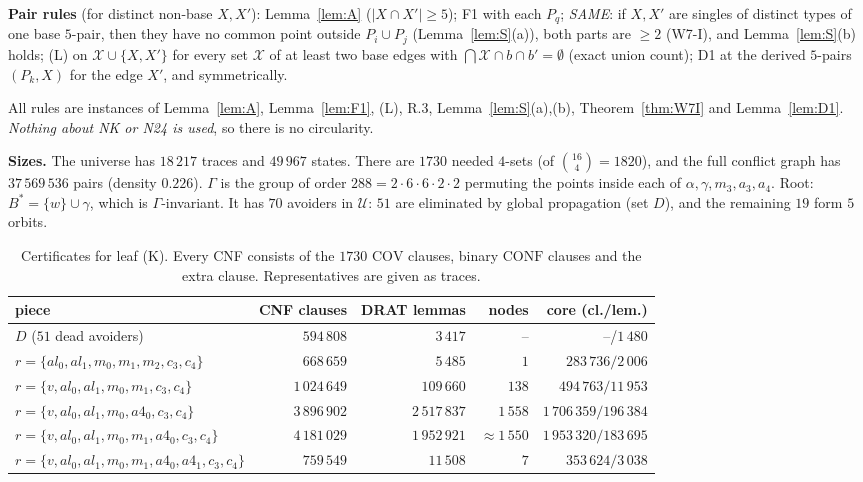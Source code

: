 \documentclass[11pt]{amsart}
\theoremstyle{definition}
\newcommand{\cU}{\mathcal{U}}
\newcommand{\Cov}{\mathrm{COV}}
\newcommand{\Conf}{\mathrm{CONF}}
\begin{document}
\textbf{Pair rules} (for distinct non-base $X,X'$): Lemma~\ref{lem:A} ($|X\cap X'|\ge5$); F1 with each $P_q$; \emph{SAME}: if $X,X'$ are singles of distinct types of one base $5$-pair, then they have no common point outside $P_i\cup P_j$ (Lemma~\ref{lem:S}(a)), both parts are $\ge2$ (W7-I), and Lemma~\ref{lem:S}(b) holds; (L) on $\mathcal X\cup\{X,X'\}$ for every set $\mathcal X$ of at least two base edges with $\bigcap\mathcal X\cap b\cap b'=\emptyset$ (exact union count); D1 at the derived $5$-pairs $(P_k,X)$ for the edge $X'$, and symmetrically.

All rules are instances of Lemma~\ref{lem:A}, Lemma~\ref{lem:F1}, (L), R.3, Lemma~\ref{lem:S}(a),(b), Theorem~\ref{thm:W7I} and Lemma~\ref{lem:D1}. \emph{Nothing about NK or N24 is used}, so there is no circularity.

\textbf{Sizes.} The universe has $18\,217$ traces and $49\,967$ states. There are $1730$ needed $4$-sets (of $\binom{16}4=1820$), and the full conflict graph has $37\,569\,536$ pairs (density $0.226$). $\Gamma$ is the group of order $288=2\cdot 6\cdot 6\cdot 2\cdot 2$ permuting the points inside each of $\alpha,\gamma,m_3,a_3,a_4$. Root: $B^*=\{w\}\cup\gamma$, which is $\Gamma$-invariant. It has $70$ avoiders in $\cU$: $51$ are eliminated by global propagation (set $D$), and the remaining $19$ form $5$ orbits.

\begin{table}[ht]\small
\caption{Certificates for leaf (K). Every CNF consists of the $1730$ $\Cov$ clauses, binary $\Conf$ clauses and the extra clause. Representatives are given as traces.}\label{tab:G14}
\setlength{\tabcolsep}{4pt}
\begin{tabular}{@{}lrrrr@{}}
\toprule
piece & CNF clauses & DRAT lemmas & nodes & core (cl./lem.)\\
\midrule
$D$ ($51$ dead avoiders) & $594\,808$ & $3\,417$ & -- & --/$1\,480$\\
$r=\{al_0,al_1,m_0,m_1,m_2,c_3,c_4\}$ & $668\,659$ & $5\,485$ & $1$ & $283\,736/2\,006$\\
$r=\{v,al_0,al_1,m_0,m_1,c_3,c_4\}$ & $1\,024\,649$ & $109\,660$ & $138$ & $494\,763/11\,953$\\
$r=\{v,al_0,al_1,m_0,a4_0,c_3,c_4\}$ & $3\,896\,902$ & $2\,517\,837$ & $1\,558$ & $1\,706\,359/196\,384$\\
$r=\{v,al_0,al_1,m_0,m_1,a4_0,c_3,c_4\}$ & $4\,181\,029$ & $1\,952\,921$ & $\approx1\,550$ & $1\,953\,320/183\,695$\\
$r=\{v,al_0,al_1,m_0,m_1,a4_0,a4_1,c_3,c_4\}$ & $759\,549$ & $11\,508$ & $7$ & $353\,624/3\,038$\\
\bottomrule
\end{tabular}
\end{table}
\end{document}
